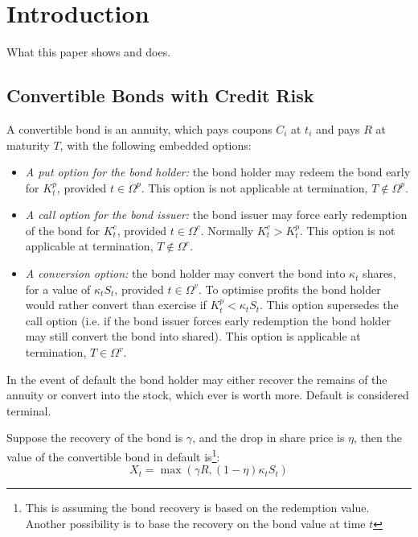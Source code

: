 \documentclass[a4paper,11pt,oneside]{report}
\theoremstyle{plain}
\theoremstyle{definition}
\def\t{\ensuremath{t}\xspace}
\def\ti{\ensuremath{t_i}\xspace}
\def\T{\ensuremath{T}\xspace}
\def\R{\ensuremath{R}\xspace}
\def\C{\ensuremath{C_i}\xspace}
\def\Kp{\ensuremath{K^{p}_t}\xspace}
\def\Kc{\ensuremath{K^{c}_t}\xspace}
\def\Kv{\ensuremath{\kappa_t}\xspace}
\def\Tp{\ensuremath{\Omega^{p}}\xspace}
\def\Tc{\ensuremath{\Omega^{c}}\xspace}
\def\Tv{\ensuremath{\Omega^{v}}\xspace}
\def\S{\ensuremath{S_t}\xspace}
\def\X{\ensuremath{X_t}\xspace}
\begin{document}
\chapter{Introduction}
What this paper shows and does.


\section{Convertible Bonds with Credit Risk}
A convertible bond is an annuity, which pays coupons \C at \ti and pays \R at maturity \T, with the following embedded options:
\begin{itemize}
 \item \emph{A put option for the bond holder:} the bond holder may redeem the bond early for \Kp, provided $\t \in \Tp$.  This option is not applicable at termination, $T \not\in \Tp$.
 \item \emph{A call option for the bond issuer:} the bond issuer may force early redemption of the bond for \Kc, provided $\t \in \Tc$.  Normally $\Kc > \Kp$.  This option is not applicable at termination, $T \not\in \Tc$.
 \item \emph{A conversion option:} the bond holder may convert the bond into \Kv shares, for a value of $\Kv\S$, provided $\t \in \Tv$.  To optimise profits the bond holder would rather convert than exercise if $\Kp < \Kv\S$.  This option supersedes the call option (i.e. if the bond issuer forces early redemption the bond holder may still convert the bond into shared).  This option is applicable at termination, $T \in \Tv$.
\end{itemize}

In the event of default the bond holder may either recover the remains of the annuity or convert into the stock, which ever is worth more.  Default is considered terminal.

Suppose the recovery of the bond is $\gamma$, and the drop in share price is $\eta$, then the value of the convertible bond in default is\footnote{This is assuming the bond recovery is based on the redemption value.  Another possibility is to base the recovery on the bond value at time \t}:
\begin{equation}
 \X = \max(\gamma\R, (1 - \eta)\Kv\S)
\end{equation}
\end{document}
